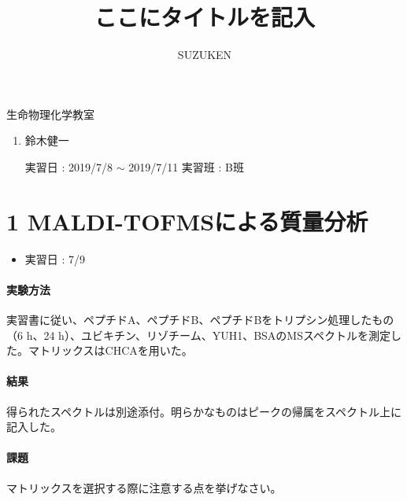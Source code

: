 \documentclass[a4paper,papersize,dvipdfmx]{jsarticle}
\begin{document}
\title{ここにタイトルを記入}
\author{SUZUKEN}
\date{}
\maketitle



生命物理化学教室
\begin{enumerate}
\item 鈴木健一

\begin{flushright}
実習日 : 2019/7/8 $\sim$ 2019/7/11
実習班 :  B班
\end{flushright}

\end{enumerate}
\part*{1 MALDI-TOFMSによる質量分析}

\begin{itemize}
\item 実習日 : 7/9

\end{itemize}
\subsection*{実験方法}

実習書に従い、ペプチドA、ペプチドB、ペプチドBをトリプシン処理したもの（6 h、24 h）、ユビキチン、リゾチーム、YUH1、BSAのMSスペクトルを測定した。マトリックスはCHCAを用いた。

\subsection*{結果}
得られたスペクトルは別途添付。明らかなものはピークの帰属をスペクトル上に記入した。


\subsection*{課題}

\begin{tcolorbox}[colback=white,colbacktitle=black!10!white,coltitle=black,title={1．}]
マトリックスを選択する際に注意する点を挙げなさい。
\end{tcolorbox}
\end{document}
